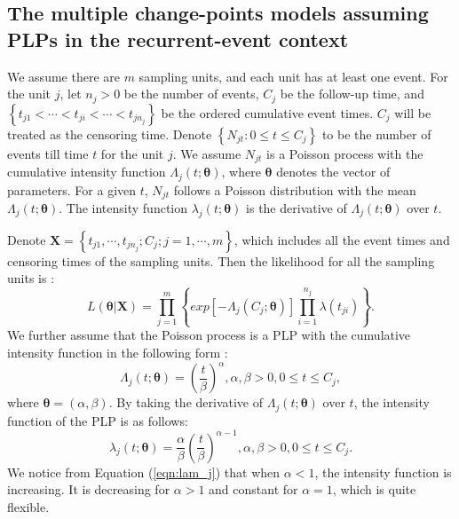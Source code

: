 \documentclass[12pt]{article}
\numberwithin{equation}{section}
\begin{document}
\subsection{The multiple change-points models assuming PLPs in the recurrent-event context}\label{sec:models.PLP}
We assume there are $m$ sampling units, and each unit has at least one event. For the unit $j$, let $n_j>0$ be the number of events, $C_j$ be the follow-up time, and  $\left\lbrace t_{j1} < \cdots<t_{ji}<\cdots<t_{jn_j}\right\rbrace $ be the ordered cumulative event times. $C_j$ will be treated as the censoring time. Denote $\left\lbrace N_{jt}: 0\leq t \leq C_j\right\rbrace $ to be the number of events till time $t$ for the unit $j$. We assume  ${N_{jt}}$ is a Poisson process with the cumulative intensity function $\Lambda_j(t;\pmb\theta)$, where $\pmb\theta$ denotes the vector of parameters. For a given $t$, ${N_{jt}}$ follows a Poisson distribution with the mean $\Lambda_j(t;\pmb\theta)$. The intensity function $\lambda_j(t;\pmb\theta)$ is the derivative of $\Lambda_j(t;\pmb\theta)$ over $t$. 

Denote $\pmb X =\left\lbrace t_{j1},\cdots,t_{jn_j};C_j;j=1,\cdots,m\right\rbrace $, which includes all the event times and censoring times of the sampling units. Then the likelihood for all the sampling units is \citep{Thompson2012}:
\begin{equation}\label{eqn:l}
L(\pmb\theta|\pmb X) = \prod_{j=1}^{m}\left\lbrace exp\left[ -\Lambda_j(C_j;\pmb\theta)\right]\prod_{i=1}^{n_j}\lambda(t_{ji}) \right\rbrace. 
\end{equation} 
We further assume that the Poisson process is a PLP with the cumulative intensity function in the following form \citep{Crow1975}:
\begin{equation}\label{eqn:Lam_j}
\Lambda_j(t;\pmb\theta) = \left( \frac{t}{\beta}\right)^\alpha, \alpha, \beta >0, 0\leq t \leq C_j,
\end{equation} 
where $\pmb\theta = (\alpha, \beta)$. By taking the derivative of $\Lambda_j(t;\pmb\theta)$ over $t$, the intensity function of the PLP is as follows: 
\begin{equation}\label{eqn:lam_j}
\lambda_j(t;\pmb\theta) = \frac{\alpha}{\beta}\left( \frac{t}{\beta}\right)^{\alpha-1}, \alpha, \beta >0,0\leq t \leq C_j.
\end{equation}
We notice from Equation (\ref{eqn:lam_j}) that when $\alpha < 1$, the intensity function is increasing. It is decreasing for $\alpha > 1$ and constant for $\alpha = 1$, which is quite flexible. 
\end{document}
